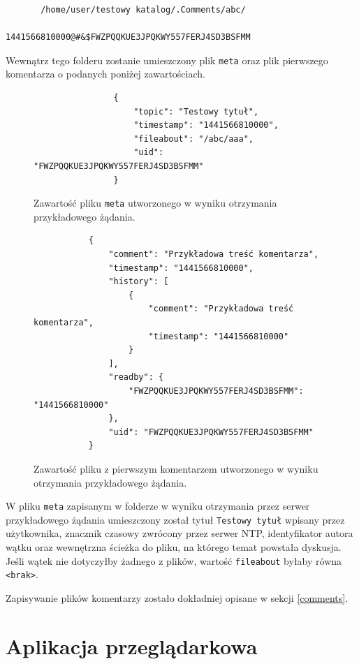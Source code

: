 \documentclass[polish,a4paper,twoside]{ppfcmthesis}
\begin{document}
\begin{verbatim}
       /home/user/testowy katalog/.Comments/abc/
                         1441566810000@#&$FWZPQQKUE3JPQKWY557FERJ4SD3BSFMM
\end{verbatim}

Wewnątrz tego folderu zostanie umieszczony plik \texttt{meta} oraz plik pierwszego komentarza o podanych poniżej zawartościach.

\begin{figure}[htb]
\begin{verbatim}
                {
                    "topic": "Testowy tytuł", 
                    "timestamp": "1441566810000", 
                    "fileabout": "/abc/aaa", 
                    "uid": "FWZPQQKUE3JPQKWY557FERJ4SD3BSFMM"
                }
\end{verbatim}
  \caption{Zawartość pliku \texttt{meta} utworzonego w wyniku otrzymania przykładowego żądania.}
\end{figure}

\begin{figure}[htb]
\begin{verbatim}
           {
               "comment": "Przykładowa treść komentarza", 
               "timestamp": "1441566810000", 
               "history": [
                   {
                       "comment": "Przykładowa treść komentarza", 
                       "timestamp": "1441566810000"
                   }
               ], 
               "readby": {
                   "FWZPQQKUE3JPQKWY557FERJ4SD3BSFMM": "1441566810000"
               }, 
               "uid": "FWZPQQKUE3JPQKWY557FERJ4SD3BSFMM"
           }
\end{verbatim}
  \caption{Zawartość pliku z pierwszym komentarzem utworzonego w wyniku otrzymania przykładowego żądania.}
\end{figure}

W pliku \texttt{meta} zapisanym w folderze w wyniku otrzymania przez serwer przykładowego żądania umieszczony został tytuł \texttt{Testowy tytuł} wpisany przez użytkownika, znacznik czasowy zwrócony przez serwer NTP, identyfikator autora wątku oraz wewnętrzna ścieżka do pliku, na którego temat powstała dyskusja. Jeśli wątek nie dotyczyłby żadnego z plików, wartość \texttt{fileabout} byłaby równa \texttt{<brak>}.

Zapisywanie plików komentarzy zostało dokładniej opisane w sekcji \ref{comments}.

\section{Aplikacja przeglądarkowa}
\end{document}
